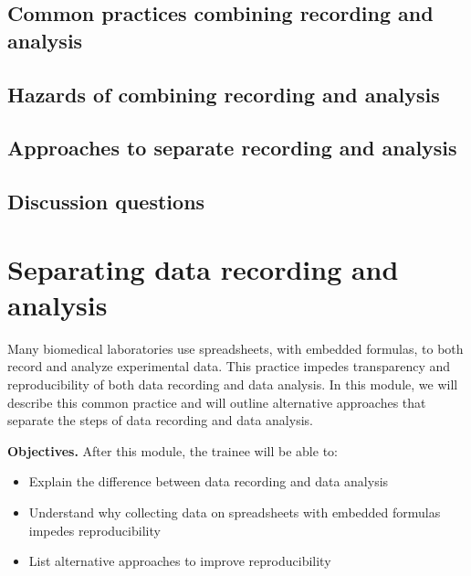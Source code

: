 \documentclass[]{tufte-book}
\providecommand{\tightlist}{%
  \setlength{\itemsep}{0pt}\setlength{\parskip}{0pt}}
\begin{document}
\hypertarget{common-practices-combining-recording-and-analysis-14}{%
\subsection{Common practices combining recording and analysis}\label{common-practices-combining-recording-and-analysis-14}}

\hypertarget{hazards-of-combining-recording-and-analysis-14}{%
\subsection{Hazards of combining recording and analysis}\label{hazards-of-combining-recording-and-analysis-14}}

\hypertarget{approaches-to-separate-recording-and-analysis-14}{%
\subsection{Approaches to separate recording and analysis}\label{approaches-to-separate-recording-and-analysis-14}}

\hypertarget{discussion-questions-14}{%
\subsection{Discussion questions}\label{discussion-questions-14}}

\hypertarget{separating-data-recording-and-analysis-15}{%
\section{Separating data recording and analysis}\label{separating-data-recording-and-analysis-15}}

Many biomedical laboratories use spreadsheets, with embedded formulas, to both
record and analyze experimental data. This practice impedes transparency and
reproducibility of both data recording and data analysis. In this module, we
will describe this common practice and will outline alternative approaches that
separate the steps of data recording and data analysis.

\textbf{Objectives.} After this module, the trainee will be able to:

\begin{itemize}
\tightlist
\item
  Explain the difference between data recording and data analysis
\item
  Understand why collecting data on spreadsheets with embedded formulas impedes
  reproducibility
\item
  List alternative approaches to improve reproducibility
\end{itemize}
\end{document}
